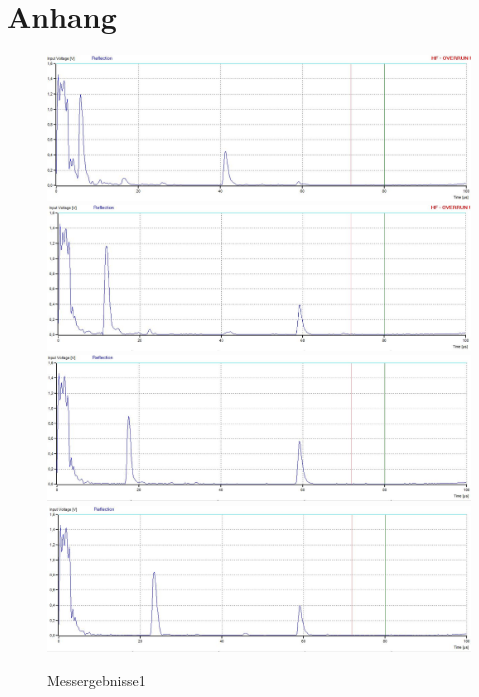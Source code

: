 \appendix
\section{Anhang}
\begin{figure}[H]
\centering
\includegraphics[width=\textwidth]{messungen/quader/bild1.jpg}
\includegraphics[width=\textwidth]{messungen/quader/bild2.jpg}
\includegraphics[width=\textwidth]{messungen/quader/bild3.jpg}
\includegraphics[width=\textwidth]{messungen/quader/bild4.jpg}
\caption{Messergebnisse1}
\label{fig:messdaten}
\end{figure}

